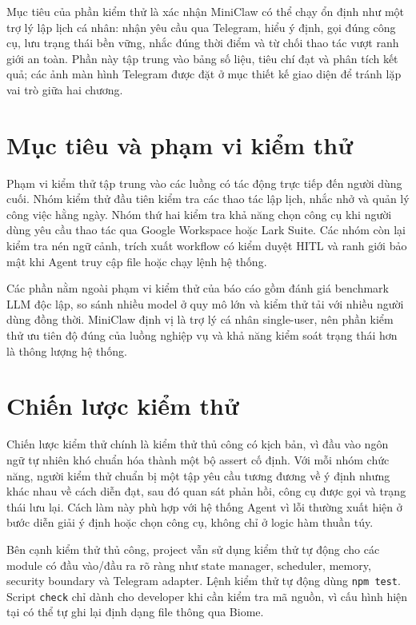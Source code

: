 Mục tiêu của phần kiểm thử là xác nhận MiniClaw có thể chạy ổn định như một trợ lý lập lịch cá nhân: nhận yêu cầu qua Telegram, hiểu ý định, gọi đúng công cụ, lưu trạng thái bền vững, nhắc đúng thời điểm và từ chối thao tác vượt ranh giới an toàn. Phần này tập trung vào bảng số liệu, tiêu chí đạt và phân tích kết quả; các ảnh màn hình Telegram được đặt ở mục thiết kế giao diện để tránh lặp vai trò giữa hai chương.

\section{Mục tiêu và phạm vi kiểm thử}
Phạm vi kiểm thử tập trung vào các luồng có tác động trực tiếp đến người dùng cuối. Nhóm kiểm thử đầu tiên kiểm tra các thao tác lập lịch, nhắc nhở và quản lý công việc hằng ngày. Nhóm thứ hai kiểm tra khả năng chọn công cụ khi người dùng yêu cầu thao tác qua Google Workspace hoặc Lark Suite. Các nhóm còn lại kiểm tra nén ngữ cảnh, trích xuất workflow có kiểm duyệt HITL và ranh giới bảo mật khi Agent truy cập file hoặc chạy lệnh hệ thống.

Các phần nằm ngoài phạm vi kiểm thử của báo cáo gồm đánh giá benchmark LLM độc lập, so sánh nhiều model ở quy mô lớn và kiểm thử tải với nhiều người dùng đồng thời. MiniClaw định vị là trợ lý cá nhân single-user, nên phần kiểm thử ưu tiên độ đúng của luồng nghiệp vụ và khả năng kiểm soát trạng thái hơn là thông lượng hệ thống.

\section{Chiến lược kiểm thử}
Chiến lược kiểm thử chính là kiểm thử thủ công có kịch bản, vì đầu vào ngôn ngữ tự nhiên khó chuẩn hóa thành một bộ assert cố định. Với mỗi nhóm chức năng, người kiểm thử chuẩn bị một tập yêu cầu tương đương về ý định nhưng khác nhau về cách diễn đạt, sau đó quan sát phản hồi, công cụ được gọi và trạng thái lưu lại. Cách làm này phù hợp với hệ thống Agent vì lỗi thường xuất hiện ở bước diễn giải ý định hoặc chọn công cụ, không chỉ ở logic hàm thuần túy.

Bên cạnh kiểm thử thủ công, project vẫn sử dụng kiểm thử tự động cho các module có đầu vào/đầu ra rõ ràng như state manager, scheduler, memory, security boundary và Telegram adapter. Lệnh kiểm thử tự động dùng \texttt{npm test}. Script \texttt{check} chỉ dành cho developer khi cần kiểm tra mã nguồn, vì cấu hình hiện tại có thể tự ghi lại định dạng file thông qua Biome.

